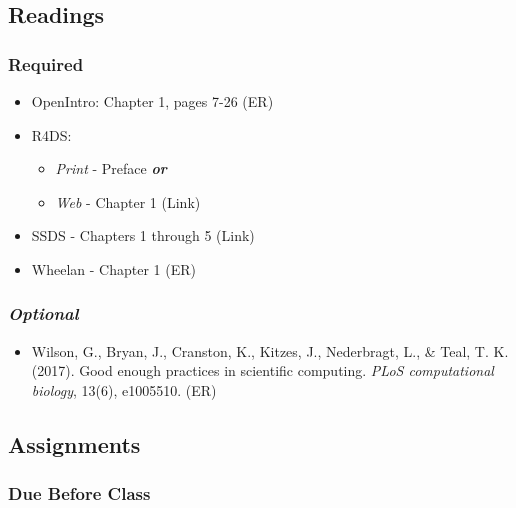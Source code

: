 \documentclass[]{book}
\providecommand{\tightlist}{%
  \setlength{\itemsep}{0pt}\setlength{\parskip}{0pt}}
\theoremstyle{definition}
\theoremstyle{definition}
\theoremstyle{definition}
\theoremstyle{remark}
\begin{document}
\subsection*{Readings}\label{readings-2}

\subsubsection*{Required}\label{required-1}

\begin{itemize}
\tightlist
\item
  OpenIntro: Chapter 1, pages 7-26 (ER)
\item
  R4DS:

  \begin{itemize}
  \tightlist
  \item
    \emph{Print} - Preface \textbf{\emph{or}}
  \item
    \emph{Web} - Chapter 1 (Link)
  \end{itemize}
\item
  SSDS - Chapters 1 through 5 (Link)
\item
  Wheelan - Chapter 1 (ER)
\end{itemize}

\subsubsection*{\texorpdfstring{\emph{Optional}}{Optional}}\label{optional-1}

\begin{itemize}
\tightlist
\item
  Wilson, G., Bryan, J., Cranston, K., Kitzes, J., Nederbragt, L., \&
  Teal, T. K. (2017). Good enough practices in scientific computing.
  \emph{PLoS computational biology}, 13(6), e1005510. (ER)
\end{itemize}

\subsection*{Assignments}\label{assignments-2}

\subsubsection*{Due Before Class}\label{due-before-class}
\end{document}
